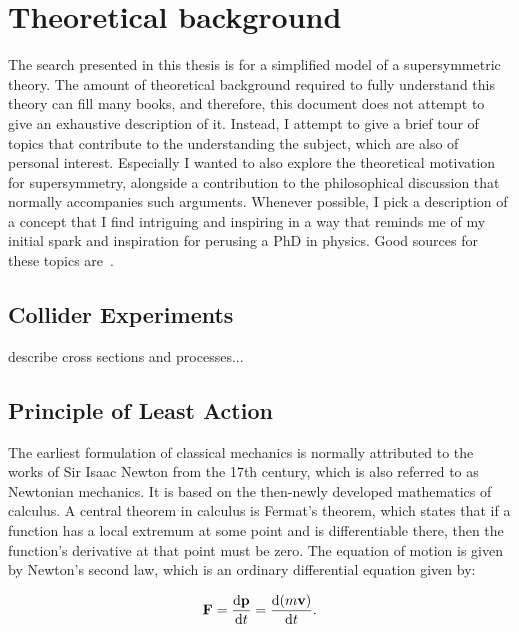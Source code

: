 \chapter{Theoretical background}

The search presented in this thesis is for a simplified model of a supersymmetric theory. The amount of theoretical background required to fully understand  this theory can fill many books, and therefore, this document does not attempt to give an exhaustive description of it. Instead, I attempt to give a brief tour of topics that contribute to the understanding the subject, which are also of personal interest. Especially I wanted to also explore the theoretical motivation for supersymmetry, alongside a contribution to the philosophical discussion that normally accompanies such arguments. Whenever possible, I pick a description of a concept that I find intriguing and inspiring in a way that reminds me of my initial spark and inspiration for perusing a PhD in physics. Good sources for these topics are~\cite{Peskin2019-bt,Srednicki2007-mn}.

\section{Collider Experiments}

describe cross sections and processes...

\section{Principle of Least Action}
\label{sec:least-action}
The earliest formulation of classical mechanics is normally attributed to the works of Sir Isaac Newton from the 17th century, which is also referred to as Newtonian mechanics. It is based on the then-newly developed mathematics of calculus. A central theorem in calculus is Fermat's theorem, which states that if a function has a local extremum at some point and is differentiable there, then the function's derivative at that point must be zero. The equation of motion is given by Newton's second law, which is an ordinary differential equation given by:

\begin{equation}
\vb{F}=\dv{\vb{p}}{t}=\dv{(m\vb{v})}{t}.
\label{eq:newton-second-law}
\end{equation}

